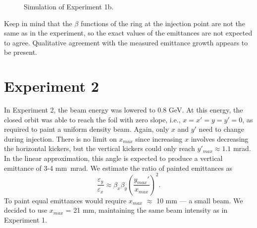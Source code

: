 \begin{figure}[!p]
\begin{subfigure}{0.7\textwidth}
    \end{subfigure}
    \caption{Simulation of Experiment 1b.}
    \label{fig:exp1b_sim}
\end{figure}
%
Keep in mind that the $\beta$ functions of the ring at the injection point are not the same as in the experiment, so the exact values of the emittances are not expected to agree. Qualitative agreement with the measured emittance growth appears to be present.



\section{Experiment 2}

In Experiment 2, the beam energy was lowered to 0.8 GeV. At this energy, the closed orbit was able to reach the foil with zero slope, i.e., $x = x' = y = y' = 0$, as required to paint a uniform density beam. Again, only $x$ and $y'$ need to change during injection. There is no limit on $x_{max}$ since increasing $x$ involves decreasing the horizontal kickers, but the vertical kickers could only reach $y'_{max} \approx 1.1$ mrad. In the linear approximation, this angle is expected to produce a vertical emittance of 3-4 mm~mrad. We estimate the ratio of painted emittances as
%
\begin{equation}\label{eq:painted_emittance_ratio}
    \frac{\varepsilon_y}{\varepsilon_x} \approx 
    \beta_x \beta_y \left(\frac{{y_{max}}'}{x_{max}}\right)^2 
    .
\end{equation}
%
To paint equal emittances would require $x_{max}$ $\approx$ 10 mm — a small beam. We decided to use $x_{max}$ = 21 mm, maintaining the same beam intensity as in Experiment 1. 

